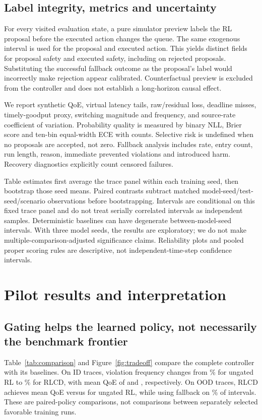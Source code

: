 \documentclass[10pt]{article}
\begin{document}
\subsection{Label integrity, metrics and uncertainty}
For every visited evaluation state, a pure simulator preview labels the RL proposal before the executed action changes the queue. The same exogenous interval is used for the proposal and executed action. This yields distinct fields for proposal safety and executed safety, including on rejected proposals. Substituting the successful fallback outcome as the proposal's label would incorrectly make rejection appear calibrated. Counterfactual preview is excluded from the controller and does not establish a long-horizon causal effect.

We report synthetic QoE, virtual latency tails, raw/residual loss, deadline misses, timely-goodput proxy, switching magnitude and frequency, and source-rate coefficient of variation. Probability quality is measured by binary NLL, Brier score and ten-bin equal-width ECE with counts. Selective risk is undefined when no proposals are accepted, not zero. Fallback analysis includes rate, entry count, run length, reason, immediate prevented violations and introduced harm. Recovery diagnostics explicitly count censored failures.

Table estimates first average the trace panel within each training seed, then bootstrap those seed means. Paired contrasts subtract matched model-seed/test-seed/scenario observations before bootstrapping. Intervals are conditional on this fixed trace panel and do not treat serially correlated intervals as independent samples. Deterministic baselines can have degenerate between-model-seed intervals. With three model seeds, the results are exploratory; we do not make multiple-comparison-adjusted significance claims. Reliability plots and pooled proper scoring rules are descriptive, not independent-time-step confidence intervals.

\section{Pilot results and interpretation}
\subsection{Gating helps the learned policy, not necessarily the benchmark frontier}
Table~\ref{tab:comparison} and Figure~\ref{fig:tradeoff} compare the complete controller with its baselines. On ID traces, violation frequency changes from \EvidenceIDRLUnsafePct\% for ungated RL to \EvidenceIDRLCDUnsafePct\% for RLCD, with mean QoE of \EvidenceIDRLQoE{} and \EvidenceIDRLCDQoE{}, respectively. On OOD traces, RLCD achieves mean QoE \EvidenceOODRLCDQoE{} versus \EvidenceOODRLQoE{} for ungated RL, while using fallback on \EvidenceOODRLCDFallbackPct\% of intervals. These are paired-policy comparisons, not comparisons between separately selected favorable training runs.
\end{document}
